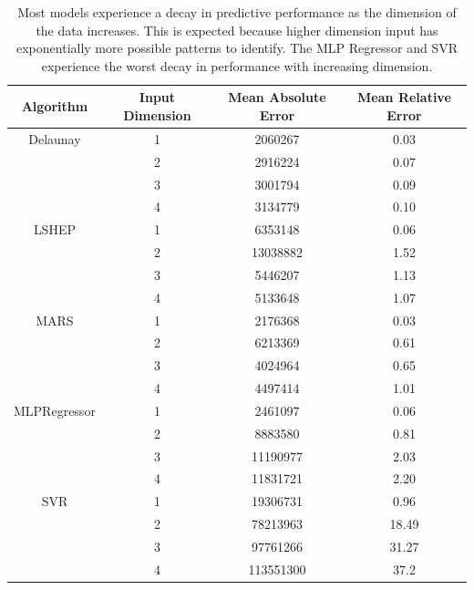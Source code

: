 \documentclass{scspaperproc}
\theoremstyle{scsthe}
\begin{document}
\begin{table}
  \centering
  \begin{tabular}{|c||c|c|c|}
    \hline
    \textbf{Algorithm} & \textbf{Input Dimension} & \textbf{Mean Absolute Error} & \textbf{Mean Relative Error}\\
    \hline
    Delaunay     & 1 & 2060267   & 0.03 \\
                 & 2 & 2916224   & 0.07 \\
                 & 3 & 3001794   & 0.09 \\
                 & 4 & 3134779   & 0.10 \\
    \hline
    LSHEP        & 1 & 6353148   & 0.06 \\
                 & 2 & 13038882  & 1.52 \\
                 & 3 & 5446207   & 1.13 \\
                 & 4 & 5133648   & 1.07 \\
    \hline
    MARS         & 1 & 2176368   & 0.03 \\
                 & 2 & 6213369   & 0.61 \\
                 & 3 & 4024964   & 0.65 \\
                 & 4 & 4497414   & 1.01 \\
    \hline
    MLPRegressor & 1 & 2461097   & 0.06 \\
                 & 2 & 8883580   & 0.81 \\
                 & 3 & 11190977  & 2.03 \\
                 & 4 & 11831721  & 2.20 \\
    \hline
    SVR          & 1 & 19306731  & 0.96 \\
                 & 2 & 78213963  & 18.49\\
                 & 3 & 97761266  & 31.27\\
                 & 4 & 113551300 & 37.2 \\
    \hline
  \end{tabular}
  \caption{Most models experience a decay in predictive performance as
    the dimension of the data increases. This is expected because
    higher dimension input has exponentially more possible patterns to
    identify. The MLP Regressor and SVR experience the worst decay in
    performance with increasing dimension.}
  \label{tab:perf_by_dim}
\end{table}
\end{document}
